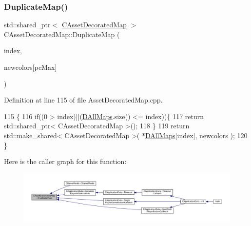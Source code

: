 \subsubsection{\texorpdfstring{Duplicate\+Map()}{DuplicateMap()}}
{\footnotesize\ttfamily std\+::shared\+\_\+ptr$<$ \hyperlink{classCAssetDecoratedMap}{C\+Asset\+Decorated\+Map} $>$ C\+Asset\+Decorated\+Map\+::\+Duplicate\+Map (\begin{DoxyParamCaption}\item[{int}]{index,  }\item[{\hyperlink{GameDataTypes_8h_aafb0ca75933357ff28a6d7efbdd7602f}{E\+Player\+Color}}]{newcolors\mbox{[}pc\+Max\mbox{]} }\end{DoxyParamCaption})\hspace{0.3cm}{\ttfamily [static]}}



Definition at line 115 of file Asset\+Decorated\+Map.\+cpp.


\begin{DoxyCode}
115                                                                                                            
       \{
116     \textcolor{keywordflow}{if}((0 > index)||(\hyperlink{classCAssetDecoratedMap_a32cdd80c7e9d31d8ce5397dd6d61dc4b}{DAllMaps}.size() <= index))\{
117         \textcolor{keywordflow}{return} std::shared\_ptr< CAssetDecoratedMap >();
118     \}
119     \textcolor{keywordflow}{return} std::make\_shared< CAssetDecoratedMap >( *\hyperlink{classCAssetDecoratedMap_a32cdd80c7e9d31d8ce5397dd6d61dc4b}{DAllMaps}[index], newcolors );
120 \}
\end{DoxyCode}
Here is the caller graph for this function\+:\nopagebreak
\begin{figure}[H]
\begin{center}
\leavevmode
\includegraphics[width=350pt]{classCAssetDecoratedMap_a9d0fa2b32e4e8add6da83a7ebcfab6d8_icgraph}
\end{center}
\end{figure}
\hypertarget{classCAssetDecoratedMap_a82c30235ceaa63c7382c662687acf9fe}{}\label{classCAssetDecoratedMap_a82c30235ceaa63c7382c662687acf9fe} 
